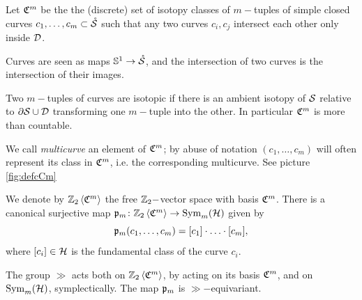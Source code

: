 \begin{defn}
\label{defn:cCm}
Let $\cC^m$ be the the (discrete) set of isotopy classes of $m-$tuples of simple closed curves $c_1,\dots,c_m\subset\mrS$
such that
 any two curves $c_i,c_j$ intersect each other only inside $\D$.
 
Curves are seen as maps $\Sone\to\mrS$, and the intersection of two curves is the intersection of their
images.

Two $m-$tuples of curves are isotopic if there is an ambient isotopy of $\S$ relative to $\partial\S\cup\D$
transforming one $m-$tuple into the other. In particular $\cC^m$ is more than countable.

We call \emph{multicurve} an element of $\cC^m$; by abuse of notation
$(c_1,\dots,c_m)$ will often represent its class in $\cC^m$, i.e. the corresponding multicurve.
See picture \ref{fig:defcCm}

We denote by $\ZcC{m}$ the free $\Z_2-$vector space with basis $\cC^m$.
There is a canonical surjective map $\pr_m\colon\ZcC{m}\to\Sym_m(\H)$ given by
\[
 \pr_m(c_1,\dots,c_m)=[c_1]\cdot\ldots\cdot[c_m],
\]
where $[c_i]\in\H$ is the fundamental class of the curve $c_i$.

The group $\gg$ acts both on $\ZcC{m}$, by acting on its basis $\cC^m$, and
on $\Sym_m(\H)$, symplectically. The map $\pr_m$ is $\gg-$equivariant.
\end{defn}


